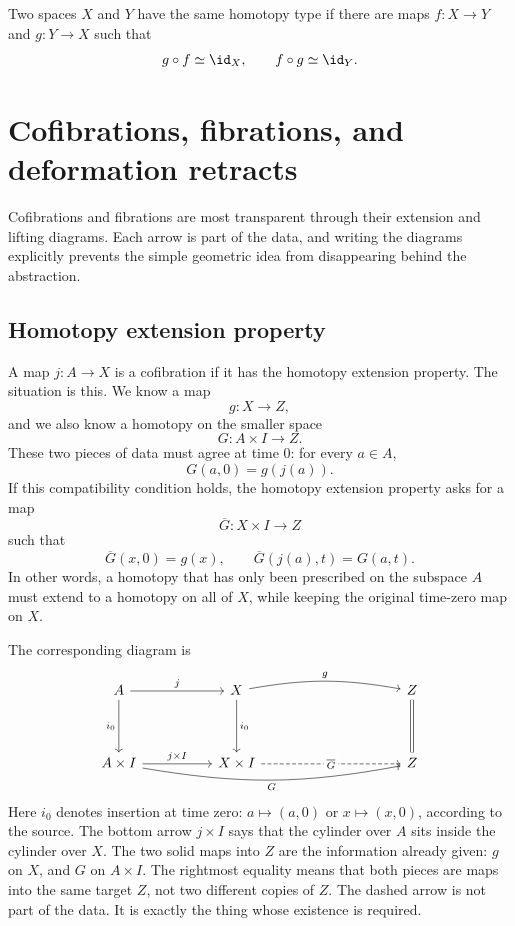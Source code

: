 \begin{definition}
Two spaces \(X\) and \(Y\) have the same homotopy type if there are maps \(f:X\to Y\) and \(g:Y\to X\) such that
\[
  g\circ f\simeq \id_X,\qquad f\circ g\simeq \id_Y.
\]
\end{definition}

\section{Cofibrations, fibrations, and deformation retracts}

Cofibrations and fibrations are most transparent through their extension and lifting diagrams.  Each arrow is part of the data, and writing the diagrams explicitly prevents the simple geometric idea from disappearing behind the abstraction.

\subsection{Homotopy extension property}

A map \(j:A\to X\) is a cofibration if it has the homotopy extension property.  The situation is this.  We know a map
\[
  g:X\to Z,
\]
and we also know a homotopy on the smaller space
\[
  G:A\times I\to Z.
\]
These two pieces of data must agree at time \(0\): for every \(a\in A\),
\[
  G(a,0)=g(j(a)).
\]
If this compatibility condition holds, the homotopy extension property asks for a map
\[
  \overline G:X\times I\to Z
\]
such that
\[
  \overline G(x,0)=g(x),
  \qquad
  \overline G(j(a),t)=G(a,t).
\]
In other words, a homotopy that has only been prescribed on the subspace \(A\) must extend to a homotopy on all of \(X\), while keeping the original time-zero map on \(X\).

The corresponding diagram is
\[
\begin{tikzcd}[column sep=5.0em,row sep=3.8em]
A \arrow[r,"j"] \arrow[d,"i_0"']
  & X \arrow[d,"i_0"] \arrow[rr,"g",bend left=10]
  & & Z \arrow[d,equal] \\
A\times I \arrow[r,"j\times I"] \arrow[rrr,"G"',bend right=10]
  & X\times I \arrow[rr,dashed,"\overline G" description]
  & & Z
\end{tikzcd}
\]
Here \(i_0\) denotes insertion at time zero: \(a\mapsto(a,0)\) or \(x\mapsto(x,0)\), according to the source.  The bottom arrow \(j\times I\) says that the cylinder over \(A\) sits inside the cylinder over \(X\).  The two solid maps into \(Z\) are the information already given: \(g\) on \(X\), and \(G\) on \(A\times I\).  The rightmost equality means that both pieces are maps into the same target \(Z\), not two different copies of \(Z\).  The dashed arrow is not part of the data.  It is exactly the thing whose existence is required.

